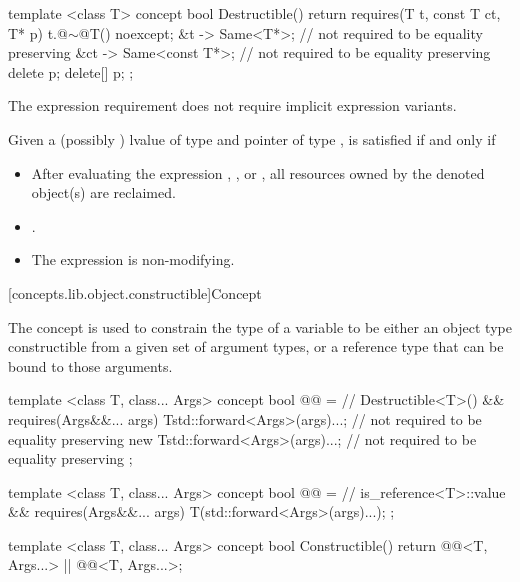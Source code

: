 %
\begin{itemdecl}
template <class T>
concept bool Destructible() {
  return requires(T t, const T ct, T* p) {
    { t.@$\sim$@T() } noexcept;
    { &t } -> Same<T*>; // not required to be equality preserving
    { &ct } -> Same<const T*>; // not required to be equality preserving
    delete p;
    delete[] p;
  };
}
\end{itemdecl}

\begin{itemdescr}
\pnum
The expression requirement  does not require implicit expression variants.

\pnum
Given a (possibly ) lvalue  of type  and pointer
 of type ,  is satisfied if and only if

\begin{itemize}
\item After evaluating the expression ,
, or , all resources owned by
the denoted object(s) are reclaimed.
\item {}.
\item The expression  is non-modifying.
\end{itemize}
\end{itemdescr}

[concepts.lib.object.constructible]{Concept }

\pnum
The  concept is used to constrain the type of a
variable to be either an object type constructible from a given set of argument
types, or a reference type that can be bound to those arguments.

%
\begin{itemdecl}
template <class T, class... Args>
concept bool @@ = // \expos
  Destructible<T>() && requires(Args&&... args) {
    T{std::forward<Args>(args)...}; // not required to be equality preserving
    new T{std::forward<Args>(args)...}; // not required to be equality preserving
  };

template <class T, class... Args>
concept bool @@ = // \expos
  is_reference<T>::value && requires(Args&&... args) {
    T(std::forward<Args>(args)...);
  };

template <class T, class... Args>
concept bool Constructible() {
  return @@<T, Args...> ||
    @@<T, Args...>;
}
\end{itemdecl}

